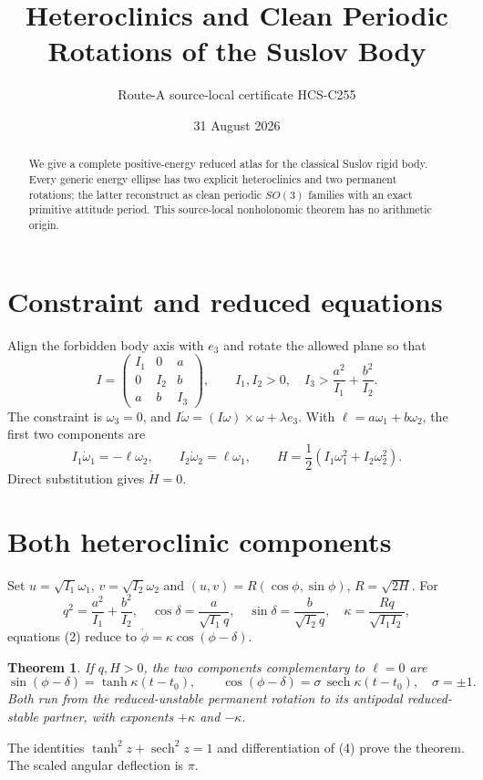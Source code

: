 \documentclass[10pt]{article}
\title{Heteroclinics and Clean Periodic Rotations of the Suslov Body}
\author{Route-A source-local certificate HCS-C255}
\date{31 August 2026}
\newtheorem{theorem}{Theorem}
\begin{document}
\maketitle
\begin{abstract}
We give a complete positive-energy reduced atlas for the classical Suslov
rigid body.  Every generic energy ellipse has two explicit heteroclinics and
two permanent rotations; the latter reconstruct as clean periodic $SO(3)$
families with an exact primitive attitude period.
This source-local nonholonomic theorem has no arithmetic origin.
\end{abstract}
\section{Constraint and reduced equations}
Align the forbidden body axis with $e_3$ and rotate the allowed plane so that
\[
 I=\begin{pmatrix}I_1&0&a\\0&I_2&b\\a&b&I_3\end{pmatrix},\qquad
 I_1,I_2>0,\quad I_3>\frac{a^2}{I_1}+\frac{b^2}{I_2}. \tag{1}
\]
The constraint is $\omega_3=0$, and
$I\dot\omega=(I\omega)\times\omega+\lambda e_3$.  With
$\ell=a\omega_1+b\omega_2$, the first two components are
\[
 I_1\dot\omega_1=-\ell\omega_2,\qquad
 I_2\dot\omega_2=\ell\omega_1,\qquad
 H=\frac12(I_1\omega_1^2+I_2\omega_2^2). \tag{2}
\]
Direct substitution gives $\dot H=0$.
\section{Both heteroclinic components}
Set $u=\sqrt{I_1}\omega_1$, $v=\sqrt{I_2}\omega_2$ and
$(u,v)=R(\cos\phi,\sin\phi)$, $R=\sqrt{2H}$.  For
\[
 q^2=\frac{a^2}{I_1}+\frac{b^2}{I_2},\quad
 \cos\delta=\frac{a}{\sqrt{I_1}q},\quad
 \sin\delta=\frac{b}{\sqrt{I_2}q},\quad
 \kappa=\frac{Rq}{\sqrt{I_1I_2}}, \tag{3}
\]
equations (2) reduce to $\dot\phi=\kappa\cos(\phi-\delta)$.
\begin{theorem}
If $q,H>0$, the two components complementary to $\ell=0$ are
\[
 \sin(\phi-\delta)=\tanh\kappa(t-t_0),\qquad
 \cos(\phi-\delta)=\sigma\,\operatorname{sech}\kappa(t-t_0),
 \quad \sigma=\pm1. \tag{4}
\]
Both run from the reduced-unstable permanent rotation to its antipodal
reduced-stable partner, with exponents $+\kappa$ and $-\kappa$.
\end{theorem}
The identities $\tanh^2z+\operatorname{sech}^2z=1$ and differentiation of
(4) prove the theorem.  The scaled angular deflection is $\pi$.
\end{document}
